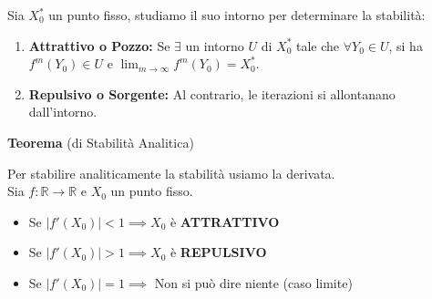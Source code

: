 \documentclass[openany]{book}
\theoremstyle{definition}
\theoremstyle{remark}
\begin{document}
\vspace{0.8cm}
\begin{center}
\end{center}

 
\vspace{1em}
Sia $X_0^*$ un punto fisso, studiamo il suo intorno per determinare la stabilità:

\begin{enumerate}
    \item \textbf{Attrattivo o Pozzo:} Se $\exists$ un intorno $U$ di $X_0^*$ tale che $\forall Y_0 \in U$, si ha $f^m(Y_0) \in U$ e $\lim_{m \to \infty} f^m(Y_0) = X_0^*$.
    \item \textbf{Repulsivo o Sorgente:} Al contrario, le iterazioni si allontanano dall'intorno.
\end{enumerate}

\textbf{Teorema} (di Stabilità Analitica)


Per stabilire analiticamente la stabilità usiamo la derivata. \\
Sia $f: \mathbb{R} \to \mathbb{R}$ e $X_0$ un punto fisso.
\begin{itemize}
    \item Se $|f'(X_0)| < 1 \implies X_0$ è \textbf{ATTRATTIVO}
    \item Se $|f'(X_0)| > 1 \implies X_0$ è \textbf{REPULSIVO}
    \item Se $|f'(X_0)| = 1 \implies$ Non si può dire niente (caso limite)
\end{itemize}
\end{document}
